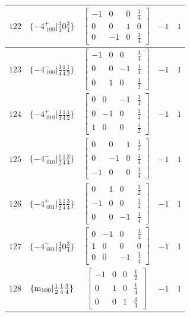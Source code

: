 \documentclass[fleqn,8pt]{jsarticle}
\begin{document}
\begin{longtable}{ccccc}
$ 122 $ & $ \{-4^{+}_{\,\,100}|\frac{3}{4} 0 \frac{3}{4}\} $ & $ \begin{bmatrix} -1 & 0 & 0 & \frac{3}{4} \\ 0 & 0 & 1 & 0 \\ 0 & -1 & 0 & \frac{3}{4} \end{bmatrix} $ & $ -1 $ & $ 1 $ \\ \hline
$ 123 $ & $ \{-4^{-}_{\,\,100}|\frac{3}{4} \frac{1}{4} \frac{1}{2}\} $ & $ \begin{bmatrix} -1 & 0 & 0 & \frac{3}{4} \\ 0 & 0 & -1 & \frac{1}{4} \\ 0 & 1 & 0 & \frac{1}{2} \end{bmatrix} $ & $ -1 $ & $ 1 $ \\ \hline
$ 124 $ & $ \{-4^{+}_{\,\,010}|\frac{3}{4} \frac{1}{4} \frac{1}{2}\} $ & $ \begin{bmatrix} 0 & 0 & -1 & \frac{3}{4} \\ 0 & -1 & 0 & \frac{1}{4} \\ 1 & 0 & 0 & \frac{1}{2} \end{bmatrix} $ & $ -1 $ & $ 1 $ \\ \hline
$ 125 $ & $ \{-4^{-}_{\,\,010}|\frac{1}{2} \frac{1}{4} \frac{3}{4}\} $ & $ \begin{bmatrix} 0 & 0 & 1 & \frac{1}{2} \\ 0 & -1 & 0 & \frac{1}{4} \\ -1 & 0 & 0 & \frac{3}{4} \end{bmatrix} $ & $ -1 $ & $ 1 $ \\ \hline
$ 126 $ & $ \{-4^{+}_{\,\,001}|\frac{1}{2} \frac{1}{4} \frac{3}{4}\} $ & $ \begin{bmatrix} 0 & 1 & 0 & \frac{1}{2} \\ -1 & 0 & 0 & \frac{1}{4} \\ 0 & 0 & -1 & \frac{3}{4} \end{bmatrix} $ & $ -1 $ & $ 1 $ \\ \hline
$ 127 $ & $ \{-4^{-}_{\,\,001}|\frac{3}{4} 0 \frac{3}{4}\} $ & $ \begin{bmatrix} 0 & -1 & 0 & \frac{3}{4} \\ 1 & 0 & 0 & 0 \\ 0 & 0 & -1 & \frac{3}{4} \end{bmatrix} $ & $ -1 $ & $ 1 $ \\ \hline
$ 128 $ & $ \{{\rm m}_{100}|\frac{1}{2} \frac{1}{4} \frac{3}{4}\} $ & $ \begin{bmatrix} -1 & 0 & 0 & \frac{1}{2} \\ 0 & 1 & 0 & \frac{1}{4} \\ 0 & 0 & 1 & \frac{3}{4} \end{bmatrix} $ & $ -1 $ & $ 1 $ \\ \hline

\end{longtable}
\end{document}
